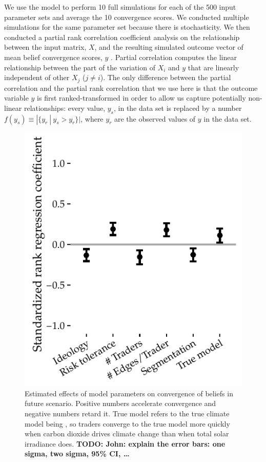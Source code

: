\documentclass{wscpaperproc}\usepackage[]{graphicx}\usepackage[]{color}
\makeatletter
\def\maxwidth{ %
  \ifdim\Gin@nat@width>\linewidth
    \linewidth
  \else
    \Gin@nat@width
  \fi
}
\newenvironment{knitrout}{}{} %
\makeatother
\begin{document}
We use the model to perform 10 full simulations for each of the 500 input parameter sets and average the 10 convergence scores. We conducted multiple simulations for the same parameter set because there is stochasticity. We then conducted a partial rank correlation coefficient analysis on the relationship between the input matrix, $X$, and the resulting simulated outcome vector of mean belief convergence scores, $y$ . Partial correlation computes the linear relationship between the part of the variation of $X_i$ and $y$ that are linearly independent of other $X_j$  ($j \neq i$).  The only difference between the partial correlation and the partial rank correlation that we use here is that the outcome variable $y$ is first ranked-transformed in order to allow us capture potentially non-linear relationships: every value, $y_s$, in the data set is replaced by a number 
$f(y_s) \equiv |\{y_r~|~ y_s > y_r\}|$, 
where $y_r$ are the observed values of $y$ in the data set.

\begin{knitrout}
\color{fgcolor}\begin{figure}

{\centering \includegraphics[width=\maxwidth]{figure/sa-1} 

}

\caption{Estimated effects of model parameters on convergence of beliefs in future scenario. Positive numbers accelerate convergence and negative numbers retard it. True model refers to the true climate model being , so traders converge to the true model more quickly when carbon dioxide drives climate change than when total solar irradiance does. \textbf{TODO: John: explain the error bars: one sigma, two sigma, 95\% CI, \dots}}\label{fig:sa}
\end{figure}


\end{knitrout}
\end{document}
